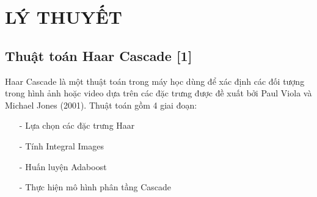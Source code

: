 \documentclass[12pt,a4paper]{article}
\begin{document}
\section{LÝ THUYẾT}
\subsection{Thuật toán Haar Cascade [1]}
Haar Cascade là một thuật toán trong máy học dùng để xác định các đối tượng trong hình ảnh hoặc video dựa trên các đặc trưng được đề xuất bởi Paul Viola và Michael Jones (2001). Thuật toán gồm 4 giai đoạn:
\begin{itemize}
\item[-] Lựa chọn các đặc trưng Haar
\item[-] Tính Integral Images
\item[-] Huấn luyện Adaboost
\item[-] Thực hiện mô hình phân tầng Cascade
\end{itemize} 
\end{document}
